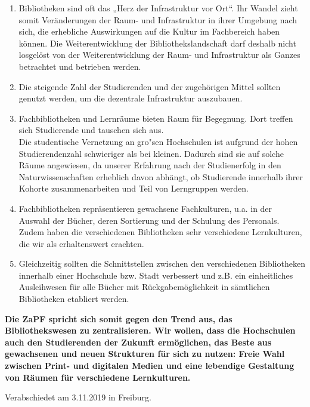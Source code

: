 \documentclass[DIV=calc]{scrartcl}
\begin{document}
\begin{enumerate}
\item Bibliotheken sind oft das „Herz der Infrastruktur vor Ort“.
Ihr Wandel zieht somit Veränderungen der Raum- und Infrastruktur in ihrer Umgebung nach sich, die erhebliche Auswirkungen auf die Kultur im Fachbereich haben können.
Die Weiterentwicklung der Bibliothekslandschaft darf deshalb nicht losgelöst von der Weiterentwicklung der Raum- und Infrastruktur als Ganzes betrachtet und betrieben werden.
\item Die steigende Zahl der Studierenden und der zugehörigen Mittel sollten genutzt werden, um die dezentrale Infrastruktur auszubauen.
\item Fachbibliotheken und Lernr\"aume bieten Raum f\"ur Begegnung.
Dort treffen sich Studierende und tauschen sich aus.\\
Die studentische Vernetzung an gro"sen Hochschulen ist aufgrund der hohen Studierendenzahl schwieriger als bei kleinen.
Dadurch sind sie auf solche Räume angewiesen, da unserer Erfahrung nach der Studienerfolg in den Naturwissenschaften erheblich davon abhängt, ob Studierende innerhalb ihrer Kohorte zusammenarbeiten und Teil von Lerngruppen werden.
\item Fachbibliotheken repräsentieren gewachsene Fachkulturen, u.a. in der Auswahl der Bücher, deren Sortierung und der Schulung des Personals.
Zudem haben die verschiedenen Bibliotheken sehr verschiedene Lernkulturen, die wir als erhaltenswert erachten.
\item Gleichzeitig sollten die Schnittstellen zwischen den verschiedenen Bibliotheken innerhalb einer Hochschule bzw. Stadt verbessert und z.B. ein einheitliches Ausleihwesen für alle Bücher mit Rückgabemöglichkeit in sämtlichen Bibliotheken etabliert werden.
\end{enumerate}

\textbf{Die ZaPF spricht sich somit gegen den Trend aus, das Bibliothekswesen zu zentralisieren.
Wir wollen, dass die Hochschulen auch den Studierenden der Zukunft ermöglichen, das Beste aus gewachsenen und neuen Strukturen für sich zu nutzen:
Freie Wahl zwischen Print- und digitalen Medien und eine lebendige Gestaltung von Räumen für verschiedene Lernkulturen.}
\vfill
    \begin{flushright}
        Verabschiedet am 3.11.2019 in Freiburg.
    \end{flushright}
\end{document}
